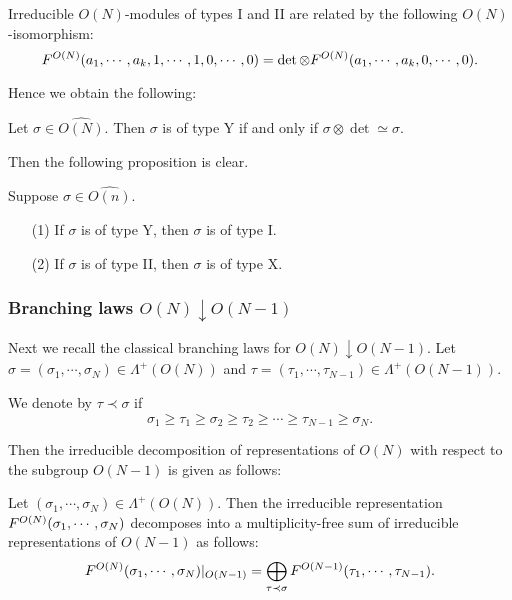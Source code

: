 Irreducible $O(N)$-modules of types I and II are related by the following $O(N)$-isomorphism:
\begin{equation}
\label{eqn:type1to2}
   F^{{O(N)}}({a_1,\cdots,a_k,1,\cdots,1,0,\cdots,0})
  =
   \det \otimes
   F^{{O(N)}}({a_1,\cdots,a_k,0,\cdots,0}).
\end{equation}


Hence we obtain the following:
\begin{lemma}
\label{lem:typeY}
Let $\sigma \in \widehat{O(N)}$.  
Then $\sigma$ is of type Y
 if and only if $\sigma \otimes \det \simeq \sigma$.  
\end{lemma}

Then the following proposition is clear.  
\begin{proposition}
\label{prop:XYI}
Suppose $\sigma \in \widehat{O(n)}$.  
\begin{enumerate}
\item[{\rm{(1)}}]
If $\sigma$ is of type Y, 
 then $\sigma$ is of type I. 
\item[{\rm{(2)}}]
If $\sigma$ is of type II, 
 then $\sigma$ is of type X. 
\end{enumerate}
\end{proposition}

\subsubsection{Branching laws $O(N) \downarrow O(N-1)$}
\label{subsec:ONbranch}

Next we recall the classical branching laws for $O(N) \downarrow O(N-1)$.  
Let $\sigma=(\sigma_1, \cdots, \sigma_N) \in \Lambda^+(O(N))$
 and $\tau=(\tau_1, \cdots, \tau_{N-1}) \in \Lambda^+(O(N-1))$.  

\begin{definition}
\label{def:Young}
We denote by 
$\tau \prec \sigma$
 if  
\[
   \sigma_1 \ge \tau_1 \ge \sigma_2 \ge \tau_2 \ge \cdots \ge \tau_{N-1} \ge \sigma_N.  
\]
\end{definition}
Then the irreducible decomposition
 of representations of $O(N)$ with respect to the subgroup $O(N-1)$
 is given as follows:
\begin{fact}
\label{fact:ONbranch}
Let $(\sigma_1, \cdots,\sigma_N) \in \Lambda^+(O(N))$.  
Then the irreducible representation
 $F^{{O(N)}}({\sigma_1, \cdots,\sigma_N})$ decomposes
 into a multiplicity-free sum
 of irreducible representations
 of $O(N-1)$ as follows:
\begin{equation}
\label{eqn:ONbranch}
   F^{{O(N)}}({\sigma_1, \cdots, \sigma_N})|_{O(N-1)}
   =
  \bigoplus_{\tau \prec \sigma} 
   F^{{O(N-1)}}({\tau_1, \cdots, \tau_{N-1}}).  
\end{equation}
\end{fact}



